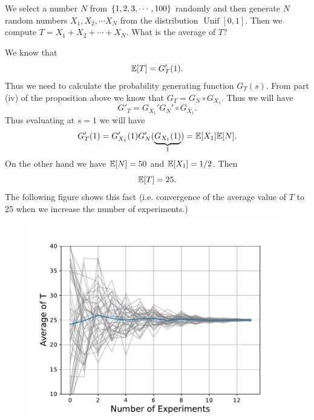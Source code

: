 \begin{example}
	We select a number $ N $ from $ \{1,2,3,\cdots,100\} $ randomly and then generate $ N $ random numbers $ X_1, X_2, \cdots X_N $ from the distribution $ \operatorname{Unif}[0,1]$. Then we compute $ T = X_1 + X_2 + \cdots +X_N $. What is the average of $ T $? 
	
	\begin{solution}
		We know that 
		\[ \mathbb{E}[T] = G'_T(1). \]
		Thus we need to calculate the probability generating function $ G_T(s) $. From part (iv) of the proposition above we know that $ G_T = G_N \circ G_{X_1} $. Thus we will have
		\[ G'_T = G_{X_1}' G_N'\circ G_{X_1}.  \]
		Thus evaluating at $ s=1 $ we will have
		\[ G'_T(1) = G_{X_1}'(1) G_N'(\underbrace{G_{X_1}(1)}_{1}) = \mathbb{E}[X_1] \mathbb{E}[N]. \]
		On the other hand we have $ \mathbb{E}[N] = 50 $ and $ \mathbb{E}[X_1] = 1/2 $. Then 
		\[ \mathbb{E}[T] = 25. \]
		The following figure shows this fact (i.e. convergence of the average value of $ T $ to 25 when we increase the number of experiments.)
		\begin{figure}[h!]
			\centering
			\includegraphics[width=0.5\linewidth]{Images/convergenceOfAverageExp.pdf}
		\end{figure}
		
 	\end{solution}
 	
\end{example}





